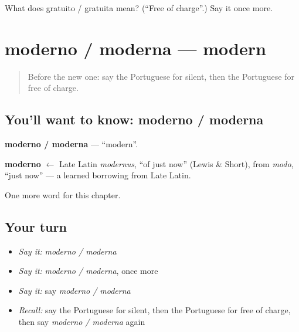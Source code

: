 \begin{tcolorbox}[breakable,colback=teal!4,colframe=teal!35!black,title={Before you move on}]
What does gratuito / gratuita mean? (\textquotedblleft{}Free of charge\textquotedblright{}.) Say it once more.
\end{tcolorbox}
\section[moderno / moderna]{moderno / moderna — modern}

\label{lesson:PT-C216-moderno-moderna}



\begin{quote}
Before the new one: say the Portuguese for silent, then the Portuguese for free of charge.
\end{quote}

\subsection*{You'll want to know: moderno / moderna}
\textbf{moderno / moderna} — \textquotedblleft{}modern\textquotedblright{}.

\begin{cousinweb}
\textbf{moderno} $\leftarrow$ Late Latin \emph{modernus}, \textquotedblleft{}of just now\textquotedblright{} (Lewis \& Short), from \emph{modo}, \textquotedblleft{}just now\textquotedblright{} — a learned borrowing from Late Latin.
\end{cousinweb}

\begin{grammarlens}[title={What you've built}]
One more word for this chapter.
\end{grammarlens}

\subsection*{Your turn}
\begin{itemize}
\raggedright
  \item \emph{Say it:} \emph{moderno / moderna}
  \item \emph{Say it:} \emph{moderno / moderna}, once more
  \item \emph{Say it:} say \emph{moderno / moderna}
  \item \emph{Recall:} say the Portuguese for silent, then the Portuguese for free of charge, then say \emph{moderno / moderna} again
\end{itemize}

